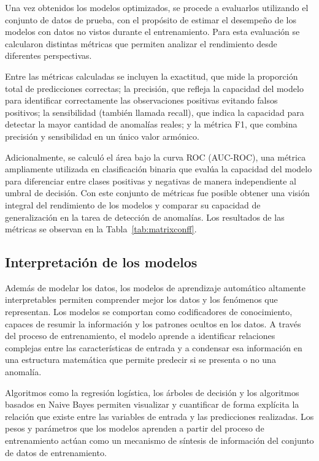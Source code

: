 \documentclass[11pt,a4paper,spanish]{book}
\numberwithin{equation}{chapter}
\numberwithin{figure}{chapter}
\begin{document}
Una vez obtenidos los modelos optimizados, se procede a evaluarlos utilizando el 
conjunto de datos de prueba, con el propósito de estimar el desempeño de los modelos 
con datos no vistos durante el entrenamiento. Para esta evaluación se calcularon 
distintas métricas que permiten analizar el rendimiento desde diferentes perspectivas. 


Entre las métricas calculadas se incluyen la exactitud, que mide la proporción total 
de predicciones correctas; la precisión, que refleja la capacidad del modelo para 
identificar correctamente las observaciones positivas evitando falsos positivos; la 
sensibilidad (también llamada recall), que indica la capacidad para detectar la mayor 
cantidad de anomalías reales; y la métrica F1, que combina precisión y sensibilidad en 
un único valor armónico.


Adicionalmente, se calculó el área bajo la curva ROC (AUC-ROC), una métrica ampliamente 
utilizada en clasificación binaria que evalúa la capacidad del modelo para diferenciar 
entre clases positivas y negativas de manera independiente al umbral de decisión. 
Con este conjunto de métricas fue posible obtener una visión integral del rendimiento 
de los modelos y comparar su capacidad de generalización en la tarea de detección de 
anomalías. Los resultados de las métricas se observan en  la Tabla~\ref{tab:matrixconff}. 


\subsection{Interpretación de los modelos}


Además de modelar los datos, los modelos de aprendizaje automático altamente 
interpretables permiten comprender mejor los datos y los fenómenos que representan. 
Los modelos se comportan como codificadores de conocimiento, capaces de resumir la 
información y los patrones ocultos en los datos. A través del proceso de entrenamiento, 
el modelo aprende a identificar relaciones complejas entre las características de entrada 
y a condensar esa información en una estructura matemática que permite predecir si se 
presenta o no una anomalía. 


Algoritmos como la regresión logística, los árboles de decisión y los algoritmos basados 
en Naive Bayes permiten visualizar y cuantificar de forma explícita la relación que 
existe entre las variables de entrada y las predicciones realizadas. Los pesos y 
parámetros que los modelos aprenden a partir del proceso de entrenamiento actúan como 
un mecanismo de síntesis de información del conjunto de datos de entrenamiento. 
\end{document}
